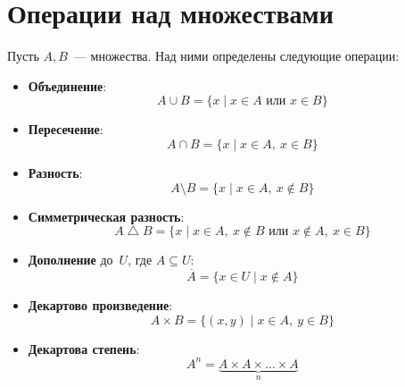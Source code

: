 \section{Операции над множествами}
Пусть $A, B$~--- множества. Над ними определены следующие операции:
\begin{itemize}
	\item\textbf{Объединение}:
	\begin{equation*}
	A \cup B = \{ x \mid x \in A \text{ или } x \in B \}
	\end{equation*}
	
	\item\textbf{Пересечение}:
	\begin{equation*}
	A \cap B = \{ x \mid x \in A, \ x \in B \}
	\end{equation*}
	
	\item\textbf{Разность}:
	\begin{equation*}
	A \setminus B = \{ x \mid x \in A, \ x \notin B \}
	\end{equation*}
	
	\item\textbf{Симметрическая разность}:
	\begin{equation*}
	A \bigtriangleup B = \{ x \mid x \in A, \ x \notin B \text{ или } x \notin A, \ x \in B \}
	\end{equation*}
	
	\item\textbf{Дополнение} до~$U$, где $A \subseteq U$:
	\begin{equation*}
	\overline A = \{ x \in U \mid x \notin A \}
	\end{equation*}
	
	\item\textbf{Декартово произведение}:
	\begin{equation*}
	A \times B = \{ (x, y) \mid x \in A, \ y \in B \}
	\end{equation*}
	
	\item\textbf{Декартова степень}:
	\begin{equation*}
	A^n = \underbrace{A \times A \times \ldots \times A}_n
	\end{equation*}
\end{itemize}